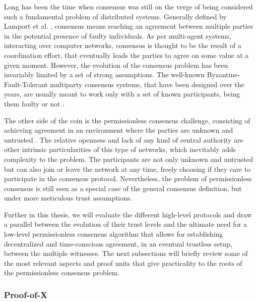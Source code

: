 
Long has been the time when consensus was still on the verge of being considered such a fundamental problem of distributed systems. Generally defined by Lamport et al. \cite{pease1980reaching, lamport2019byzantine}, consensus means reaching an agreement between multiple parties in the potential presence of faulty individuals. As per multi-agent systems, interacting over computer networks, consensus is thought to be the result of a coordination effort, that eventually leads the parties to agree on some value at a given moment. However, the evolution of the consensus problem has been invariably limited by a set of strong assumptions. The well-known Byzantine-Fault-Tolerant multiparty consensus systems, that have been designed over the years, are usually meant to work only with a set of known participants, being them faulty or not \cite{castro1999practical}. 

The other side of the coin is the permissionless consensus challenge, consisting of achieving agreement in an environment where the parties are unknown and untrusted \cite{nakamoto2008bitcoin, buterin2014next}. The relative openness and lack of any kind of central authority are other intrinsic particularities of this type of networks, which inevitably adds complexity to the problem. The participants are not only unknown and untrusted but can also join or leave the network at any time, freely choosing if they care to participate in the consensus protocol. Nevertheless, the problem of permissionless consensus is still seen as a special case of the general consensus definition, but under more meticulous trust assumptions.

Further in this thesis, we will evaluate the different high-level \pol{} protocols and draw a parallel between the evolution of their trust levels and the ultimate need for a low-level permissionless consensus algorithm that allows for establishing decentralized and time-conscious agreement, in an eventual trustless setup, between the multiple witnesses. The next subsections will briefly review some of the most relevant aspects and proof units that give practicality to the roots of the permissionless consensus problem.

\subsubsection{Proof-of-X}

